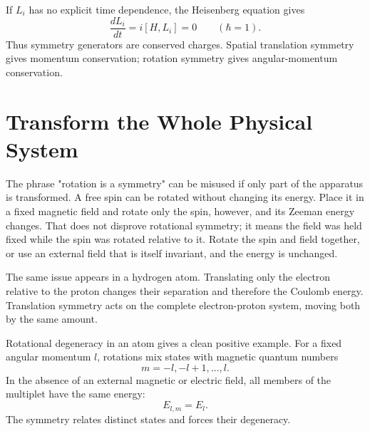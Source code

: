 If \(L_i\) has no explicit time dependence, the Heisenberg equation gives
\begin{equation}
\frac{dL_i}{dt}
=i[H,L_i]=0
\qquad(\hbar=1).
\end{equation}
Thus symmetry generators are conserved charges. Spatial translation symmetry gives momentum conservation; rotation symmetry gives angular-momentum conservation. 

\section{Transform the Whole Physical System}

The phrase "rotation is a symmetry" can be misused if only part of the apparatus is transformed. A free spin can be rotated without changing its energy. Place it in a fixed magnetic field and rotate only the spin, however, and its Zeeman energy changes. That does not disprove rotational symmetry; it means the field was held fixed while the spin was rotated relative to it. Rotate the spin and field together, or use an external field that is itself invariant, and the energy is unchanged.

The same issue appears in a hydrogen atom. Translating only the electron relative to the proton changes their separation and therefore the Coulomb energy. Translation symmetry acts on the complete electron-proton system, moving both by the same amount.

\begin{classroomqa}
\end{classroomqa}

Rotational degeneracy in an atom gives a clean positive example. For a fixed angular momentum \(l\), rotations mix states with magnetic quantum numbers
\begin{equation}
m=-l,-l+1,\ldots,l.
\end{equation}
In the absence of an external magnetic or electric field, all members of the multiplet have the same energy:
\begin{equation}
E_{l,m}=E_l.
\end{equation}
The symmetry relates distinct states and forces their degeneracy.

